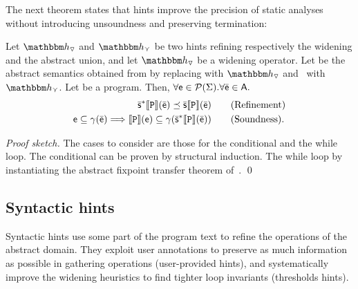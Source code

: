 \documentclass[sttt]{svjour}
\newcommand{\sopra}{}
\begin{document}
The next theorem states that hints improve the precision of static analyses without introducing unsoundness and preserving termination:

\begin{theorem}
Let $\hint{\widening}$ and $\hint{\cjoin}$ be two hints refining respectively the widening and the abstract union, and let $\hint{\widening}$ be a widening operator.
Let \asemRefined{\cdot} be the abstract semantics obtained from \asem{\cdot} by replacing \widening with $\hint{\widening}$ and \cjoin\ with $\hint{\cjoin}$.
Let  be a program.
Then, $\forall \mathsf{e}\in \mathcal{P}{(\Sigma)}. \forall \bar{\mathsf{\mathsf{e}}} \in \mathsf{A}.$ 
\[
\begin{aligned}
\mathbb{\bar{\mathsf{s}}^*}\llbracket \mathtt{P} \rrbracket(\bar{\mathsf{\mathsf{e}}}) \preceq \mathbb{\bar{\mathsf{s}}}\llbracket \mathtt{P} \rrbracket(\bar{\mathsf{\mathsf{e}}}) & \qquad \text{\textrm{(Refinement)}}  \\
\mathsf{e} \subseteq \gamma(\bar{\mathsf{\mathsf{e}}}) \Longrightarrow \llbracket \mathtt{P} \rrbracket(\mathsf{e}) \subseteq \gamma(\mathbb{\bar{\mathsf{s}}^*}\llbracket \mathtt{P} \rrbracket(\bar{\mathsf{\mathsf{e}}})) & \qquad \text{\textrm{(Soundness)}}.
\end{aligned}
\]
\end{theorem}
\textit{Proof sketch.}
The cases to consider are those for the conditional and the while loop.
The conditional can be proven by structural induction.
The while loop  by instantiating the abstract fixpoint transfer theorem of~\cite{CousotCousot92-1}.
\qed

\subsection{Syntactic hints}
\label{sec:Syntactichints}
Syntactic hints use some part of the program text to refine the operations of the abstract domain.
They exploit user annotations to preserve as much information as possible in gathering operations (user-provided hints), and systematically improve the widening heuristics to find tighter loop invariants (thresholds hints).

\end{document}
